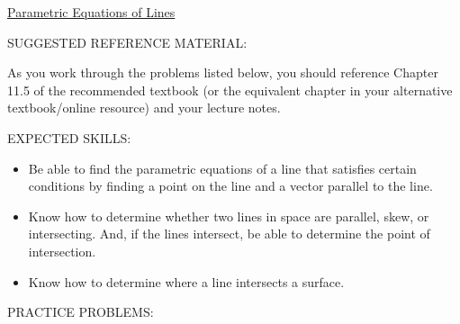 \documentclass[12pt]{article}
\begin{document}
\begin{center}
\underline{\LARGE{Parametric Equations of Lines}}
\end{center}

\noindent SUGGESTED REFERENCE MATERIAL:

\bigskip

\noindent As you work through the problems listed below, you should reference Chapter 11.5 of the recommended textbook (or the equivalent chapter in your alternative textbook/online resource) and your lecture notes.

\bigskip

\noindent EXPECTED SKILLS:

\begin{itemize}

\item Be able to find the parametric equations of a line that satisfies certain conditions by finding a point on the line and a vector parallel to the line. 

\item Know how to determine whether two lines in space are parallel, skew, or intersecting.  And, if the lines intersect, be able to determine the point of intersection.

\item Know how to determine where a line intersects a surface.

\end{itemize}

\noindent PRACTICE PROBLEMS:

\medskip

\end{document}
